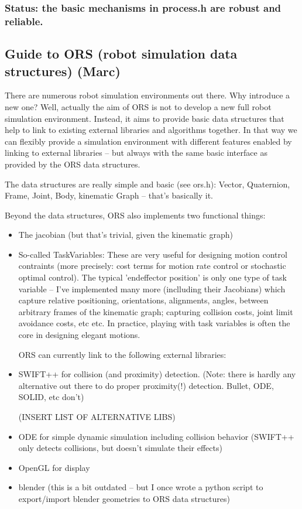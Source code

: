 \subsubsection{Status: the basic mechanisms in process.h are robust and reliable. }

\subsection{Guide to ORS (robot simulation data structures) (Marc)}

There are numerous robot simulation environments out there. Why
introduce a new one? Well, actually the aim of ORS is not to develop a
new full robot simulation environment. Instead, it aims to provide
basic data structures that help to link to existing external libraries
and algorithms together. In that way we can flexibly provide a
simulation environment with different features enabled by linking to
external libraries -- but always with the same basic interface as
provided by the ORS data structures.

The data structures are really simple and basic (see ors.h): Vector, Quaternion, Frame, Joint, Body, kinematic Graph -- that's basically it.

Beyond the data structures, ORS also implements two functional things:

\begin{itemize}
\item The jacobian (but that's trivial, given the kinematic graph)

\item So-called TaskVariables: These are very useful for designing motion
   control contraints (more precisely: cost terms for motion rate
   control or stochastic optimal control). The typical 'endeffector
   position' is only one type of task variable -- I've implemented
   many more (inclluding their Jacobians) which capture relative
   positioning, orientations, alignments, angles, between arbitrary
   frames of the kinematic graph; capturing collision costs, joint
   limit avoidance costs, etc etc. In practice, playing with task
   variables is often the core in designing elegant motions.

   ORS can currently link to the following external libraries:


\item SWIFT++ for collision (and proximity) detection. (Note: there is
   hardly any alternative out there to do proper proximity(!)
   detection. Bullet, ODE, SOLID, etc don't)

   (INSERT LIST OF ALTERNATIVE LIBS)

\item ODE for simple dynamic simulation including collision behavior
   (SWIFT++ only detects collisions, but doesn't simulate their
   effects)

\item OpenGL for display

\item blender (this is a bit outdated -- but I once wrote a python script
   to export/import blender geometries to ORS data structures)
\end{itemize}

